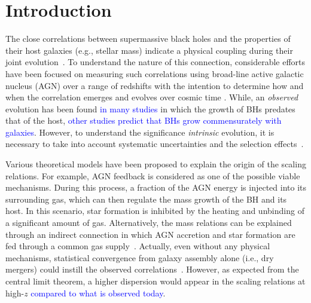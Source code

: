 \documentclass[twocolumn]{aastex631}
\newcommand{\blue}[1]{\textcolor{blue}{#1}}
\newcommand{\aklant}[1]{\textcolor{blue}{#1}}
\begin{document}
\begin{abstract}


\end{abstract}

\section{Introduction} \label{sec:intro}

The close correlations between supermassive black holes and the properties of their host galaxies (e.g., stellar mass) indicate a physical coupling during their joint evolution~\citep{Mag++98, F+M00, M+H03, H+R04, Gul++09}. To understand the nature of this connection, considerable efforts have been focused on measuring such correlations using broad-line active galactic nucleus (AGN) over a range of redshifts with the intention to determine how and when the correlation emerges and evolves over cosmic time \citep[e.g.,][]{Tre++04,Peng2006a, Tre++07, Woo++08, Jahnke2009, Bennert11, Schramm2013, Park15, Mechtley2016, Ding2020, 2021arXiv210902751L}. While, an {\it observed} evolution has been found \blue{in many studies} in which the growth of BHs predates that of the host, \blue{other studies predict that BHs grow commensurately with galaxies}.
However, to understand the significance {\it intrinsic} evolution, it is necessary to take into account systematic uncertainties and the selection effects~\citep{Tre++07, Lauer2007, Schulze2014, Park15}. 

Various theoretical models have been proposed to explain the origin of the scaling relations. For example, AGN feedback is considered as one of the possible viable mechanisms. During this process, a fraction of the AGN energy is injected into its surrounding gas, which can then regulate the mass growth of the BH and its host. In this scenario, star formation is inhibited by the heating and unbinding of a significant amount of gas. Alternatively, the mass relations can be explained through an indirect connection in which AGN accretion and star formation are fed through a common gas supply~\citep{Cen2015, Menci2016}. Actually, even without any physical mechanisms, statistical convergence from galaxy assembly alone (i.e., dry mergers) could instill the observed correlations~\citep{Peng2007, Jahnke2011, Hirschmann2010}. However, as expected from the central limit theorem, a higher dispersion would appear in the scaling relations at high-$z$ %
\blue{compared to what is observed today}. 
\end{document}
